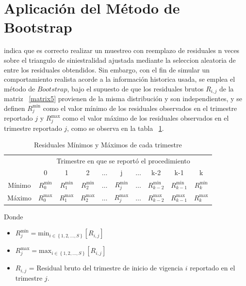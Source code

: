 \documentclass[11pt,twoside,openright,spanish]{report}
\numberwithin{equation}{chapter}
\numberwithin{figure}{chapter}
\numberwithin{table}{chapter}
\begin{document}
\section{Aplicación del Método de Bootstrap}
 
	 \citet{QLowe} indica que es correcto realizar un muestreo con reemplazo de residuales n veces sobre el triangulo de siniestralidad ajustada mediante  la seleccion aleatoria de entre los residuales obtendidos. Sin embargo, con el fin de simular un comportamiento realista acorde a la información historica usada, se emplea el método de $Bootstrap$, bajo el supuesto de que los residuales brutos $R_{i,j}$ de la matriz ~\ref{matrix5} provienen de la misma distribución y son independientes, y se definen $R_{j}^{\text{min}}$ como el valor mínimo de los residuales observados en el trimestre reportado $j$ y $R_{j}^{\text{max}}$ como el valor máximo de los residuales observados en el trimestre reportado $j$, como se observa en la tabla ~\ref{matrix6}.
	
	\begin{table}[ht]
		\centering
		\begin{tabularx}{\linewidth}{ c|ccccccccc}
			& \multicolumn{9}{c}{Trimestre en que se reportó el procedimiento} \\
			& 0  & 1 & 2 & $ \dots $ & j & $\dots $ & k-2 & k-1 &  k\\
			\midrule
			Mínimo      &  $R_{0}^{\text{min}}$ & $R_{1}^{\text{min}}$ & $R_{2}^{\text{min}}$ & $ \dots $ & $R_{j}^{\text{min}}$ & $ \dots $ & $R_{k-2}^{\text{min}}$ & $R_{k-1}^{\text{min}}$ & $R_{k}^{\text{min}}$ \\
			Máximo      &  $R_{0}^{\text{max}}$ & $R_{1}^{\text{max}}$ & $R_{2}^{\text{max}}$ & $ \dots $ & $R_{j}^{\text{max}}$ & $ \dots $ & $R_{k-2}^{\text{max}}$ & $R_{k-1}^{\text{max}}$ & $R_{k}^{\text{max}}$ \\
		\end{tabularx}
	\caption{Residuales Mínimos y Máximos de cada trimestre}
	\label{matrix6}
	\end{table}
	
Donde
	
\begin{itemize}
	
	\setlength\itemsep{-0.5em}
	
	\item $R_{j}^{\text{min}}= \text{min}_{ i\in \left\{1,2,\dots ,S\right\}} \left[R_{i,j}^{}\right]$	
	
	\item $R_{j}^{\text{max}}= \text{max}_{ i\in \left\{1,2,\dots ,S\right\}} \left[R_{i,j}^{}\right]$
	
	\item $R_{i,j}$ = Residual bruto del trimestre de inicio de vigencia $i$ reportado en el trimestre $j$.
		
\end{itemize} 
\end{document}
